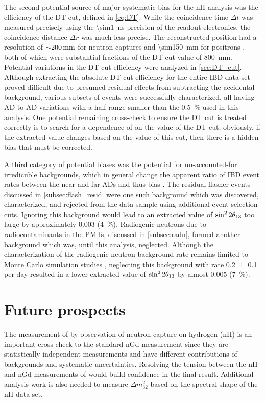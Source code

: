 The second potential source of major systematic bias for the nH analysis
was the efficiency of the DT cut, defined in \cref{eq:DT}.
While the coincidence time $\Delta t$ was measured precisely
using the \SI{\sim1}{\ns} precision of the readout electronics,
the coincidence distance $\Delta r$ was much less precise.
The reconstructed position had a resolution
of $\SI{\sim200}{\mm}$ for neutron captures
and \SI{\sim150}{\mm} for positrons \cite{adsimple1},
both of which were substantial fractions of the DT cut value of \SI{800}{\mm}.
Potential variations in the DT cut efficiency
were analyzed in \cref{sec:DT_cut}.
Although extracting the absolute DT cut efficiency
for the entire IBD data set proved difficult
due to presumed residual effects from subtracting the accidental background,
various subsets of events were successfully characterized,
all having AD-to-AD variations with a half-range smaller than
the \SI{0.5}{\percent} used in this analysis.
One potential remaining cross-check to ensure the DT cut is treated correctly
is to search for a dependence of \thetaot{} on the value of the DT cut;
obviously, if the extracted value \thetaot{} changes
based on the value of this cut,
then there is a hidden bias that must be corrected.

A third category of potential biases
was the potential for un-accounted-for irredicuble backgrounds,
which in general change the apparent ratio of IBD event rates
between the near and far ADs and thus bias \thetaot{}.
The residual flasher events discussed in \cref{subsec:flash_resid}
were one such background which was discovered, characterized,
and rejected from the data sample using additional event selection cuts.
Ignoring this background would lead to an extracted value of $\sin^22\theta_{13}$
too large by approximately \num{0.003} (\SI{4}{\percent}).
Radiogenic neutrons due to radiocontaminants in the PMTs,
discussed in \cref{subsec:radn},
formed another background which was, until this analysis, neglected.
Although the characterization of the radiogenic neutron background rate
remains limited to Monte Carlo simulation studies \cite{rad_n},
neglecting this background with rate \num{0.2\pm0.1} per day
resulted in a lower extracted value of $\sin^22\theta_{13}$
by almost \num{0.005} (\SI{7}{\percent}).

\section{Future prospects}
\label{sec:future}

The measurement of \thetaot{} by observation of neutron capture on hydrogen (nH)
is an important cross-check to the standard nGd measurement
since they are statistically-independent measurements and
have different contributions of backgrounds and systematic uncertainties.
Resolving the tension between the nH and nGd measurements of \thetaot{}
would build confidence in the final result.
Additional analysis work is also needed to measure $\Delta m^2_{32}$
based on the spectral shape of the nH data set.

